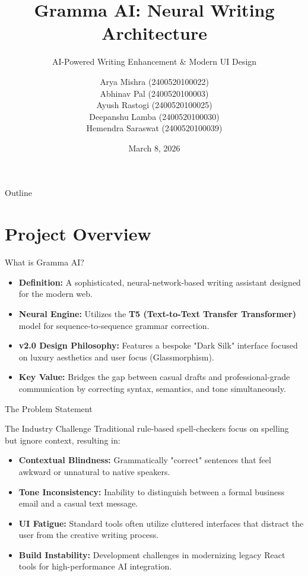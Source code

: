 \documentclass{beamer}
\title[Gramma AI v2.0]{Gramma AI: Neural Writing Architecture}
\subtitle{AI-Powered Writing Enhancement \& Modern UI Design}
\author{
Arya Mishra       (2400520100022) \\
Abhinav Pal       (2400520100003) \\
Ayush Rastogi     (2400520100025) \\
Deepanshu Lamba   (2400520100030) \\
Hemendra Saraswat (2400520100039)
}
\institute{Department of Computer Science}
\date{March 8, 2026}
\begin{document}
\begin{frame}
    \titlepage
\end{frame}

\begin{frame}{Outline}
    \tableofcontents
\end{frame}

\section{Project Overview}
\begin{frame}{What is Gramma AI?}
    \begin{itemize}
        \item \textbf{Definition:} A sophisticated, neural-network-based writing assistant designed for the modern web.
        \item \textbf{Neural Engine:} Utilizes the \textbf{T5 (Text-to-Text Transfer Transformer)} model for sequence-to-sequence grammar correction.
        \item \textbf{v2.0 Design Philosophy:} Features a bespoke "Dark Silk" interface focused on luxury aesthetics and user focus (Glassmorphism).
        \item \textbf{Key Value:} Bridges the gap between casual drafts and professional-grade communication by correcting syntax, semantics, and tone simultaneously.
    \end{itemize}
\end{frame}

\begin{frame}{The Problem Statement}
    \begin{block}{The Industry Challenge}
        Traditional rule-based spell-checkers focus on spelling but ignore context, resulting in:
    \end{block}
    \begin{itemize}
        \item \textbf{Contextual Blindness:} Grammatically "correct" sentences that feel awkward or unnatural to native speakers.
        \item \textbf{Tone Inconsistency:} Inability to distinguish between a formal business email and a casual text message.
        \item \textbf{UI Fatigue:} Standard tools often utilize cluttered interfaces that distract the user from the creative writing process.
        \item \textbf{Build Instability:} Development challenges in modernizing legacy React tools for high-performance AI integration.
    \end{itemize}
\end{frame}
\end{document}
